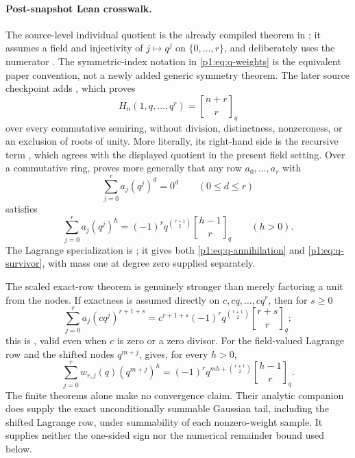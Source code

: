 \documentclass[11pt,oneside]{article}
\numberwithin{equation}{section}
\theoremstyle{definition}
\theoremstyle{remark}
\newcommand{\qbinom}[3]{\genfrac{[}{]}{0pt}{}{#1}{#2}_{#3}}
\begin{document}
\paragraph{Post-snapshot Lean crosswalk.}
The source-level individual quotient is the already compiled theorem
 in
; it assumes a field and injectivity of
\(j\mapsto q^j\) on \(\{0,\ldots,r\}\), and deliberately uses the numerator
.  The symmetric-index notation in
\eqref{p1:eq:q-weights} is the equivalent paper convention, not a newly added
generic symmetry theorem.  The later source checkpoint
 adds
, which proves
\[
 H_n(1,q,\ldots,q^r)=\qbinom{n+r}{r}{q}
\]
over every commutative semiring, without division, distinctness, nonzeroness, or
an exclusion of roots of unity.  More literally, its right-hand side is the
recursive term , which agrees with the
displayed quotient in the present field setting.  Over a commutative ring,
 proves more generally that any row
\(a_0,\ldots,a_r\) with
\[
 \sum_{j=0}^{r}a_j(q^j)^d=0^d\qquad(0\le d\le r)
\]
satisfies
\[
 \sum_{j=0}^{r}a_j(q^j)^h
 =(-1)^r q^{\binom{r+1}{2}}\qbinom{h-1}{r}{q}
 \qquad(h>0).
\]
The Lagrange specialization is
; it gives both
\eqref{p1:eq:q-annihilation} and \eqref{p1:eq:q-survivor}, with mass one at degree
zero supplied separately.

The scaled exact-row theorem is genuinely stronger than merely factoring a
unit from the nodes.  If exactness is assumed directly on
\(c,cq,\ldots,cq^r\), then for \(s\ge0\)
\[
 \sum_{j=0}^{r}a_j(cq^j)^{r+1+s}
 =c^{r+1+s}(-1)^r q^{\binom{r+1}{2}}
   \qbinom{r+s}{r}{q};
\]
this is , valid even when
\(c\) is zero or a zero divisor.  For the field-valued Lagrange row and the
shifted nodes \(q^{m+j}\),
 gives, for every
\(h>0\),
\[
 \sum_{j=0}^{r}w_{r,j}(q)(q^{m+j})^h
 =(-1)^r q^{mh+\binom{r+1}{2}}\qbinom{h-1}{r}{q}.
\]
The finite theorems alone make no convergence claim.  Their analytic companion
 does supply the exact unconditionally summable
Gaussian tail, including the shifted Lagrange row, under summability of each
nonzero-weight sample.  It supplies neither the one-sided sign nor the numerical
remainder bound used below.
\end{document}
